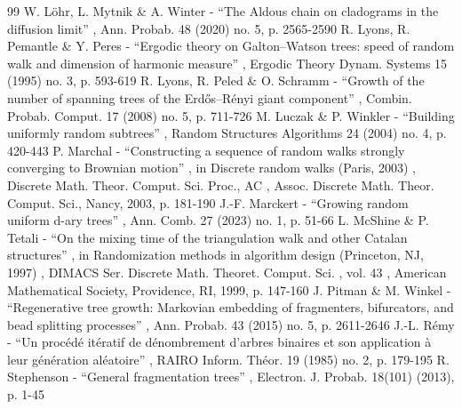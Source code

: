 \documentclass[11pt]{article}
\theoremstyle{definition}
\begin{document}
\begin{thebibliography}{99}
 W. Löhr, L. Mytnik \& A. Winter - “The Aldous chain on cladograms in the diffusion limit” , Ann. Probab. 48 (2020) no. 5, p. 2565-2590
 R. Lyons, R. Pemantle \& Y. Peres - “Ergodic theory on Galton–Watson trees: speed of random walk and dimension of harmonic measure” , Ergodic Theory Dynam. Systems 15 (1995) no. 3, p. 593-619
 R. Lyons, R. Peled \& O. Schramm - “Growth of the number of spanning trees of the Erdős–Rényi giant component” , Combin. Probab. Comput. 17 (2008) no. 5, p. 711-726
 M. Luczak \& P. Winkler - “Building uniformly random subtrees” , Random Structures Algorithms 24 (2004) no. 4, p. 420-443
 P. Marchal - “Constructing a sequence of random walks strongly converging to Brownian motion” , in Discrete random walks (Paris, 2003) , Discrete Math. Theor. Comput. Sci. Proc., AC , Assoc. Discrete Math. Theor. Comput. Sci., Nancy, 2003, p. 181-190
 J.-F. Marckert - “Growing random uniform d-ary trees” , Ann. Comb. 27 (2023) no. 1, p. 51-66
 L. McShine \& P. Tetali - “On the mixing time of the triangulation walk and other Catalan structures” , in Randomization methods in algorithm design (Princeton, NJ, 1997) , DIMACS Ser. Discrete Math. Theoret. Comput. Sci. , vol. 43 , American Mathematical Society, Providence, RI, 1999, p. 147-160
 J. Pitman \& M. Winkel - “Regenerative tree growth: Markovian embedding of fragmenters, bifurcators, and bead splitting processes” , Ann. Probab. 43 (2015) no. 5, p. 2611-2646
 J.-L. Rémy - “Un procédé itératif de dénombrement d’arbres binaires et son application à leur génération aléatoire” , RAIRO Inform. Théor. 19 (1985) no. 2, p. 179-195
 R. Stephenson - “General fragmentation trees” , Electron. J. Probab. 18(101) (2013), p. 1-45
\end{thebibliography}
\end{document}
